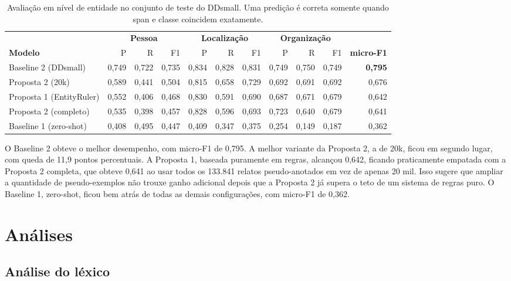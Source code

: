 \documentclass[12pt,a4paper]{article}
\begin{document}
\begin{table}[H]
\centering
\caption{Avaliação em nível de entidade no conjunto de teste do DDsmall.
Uma predição é correta somente quando span e classe coincidem exatamente.}
\label{tab:entidade}
\small
\begin{tabular}{lrrrrrrrrrr}
\toprule
& \multicolumn{3}{c}{\textbf{Pessoa}} & \multicolumn{3}{c}{\textbf{Localização}} & \multicolumn{3}{c}{\textbf{Organização}} & \\
\cmidrule(lr){2-4}\cmidrule(lr){5-7}\cmidrule(lr){8-10}
\textbf{Modelo} & P & R & F1 & P & R & F1 & P & R & F1 & \textbf{micro-F1} \\
\midrule
Baseline 2 (DDsmall)    & 0,749 & 0,722 & 0,735 & 0,834 & 0,828 & 0,831 & 0,749 & 0,750 & 0,749 & \textbf{0,795} \\
Proposta 2 (20k)        & 0,589 & 0,441 & 0,504 & 0,815 & 0,658 & 0,729 & 0,692 & 0,691 & 0,692 & 0,676 \\
Proposta 1 (EntityRuler)& 0,552 & 0,406 & 0,468 & 0,830 & 0,591 & 0,690 & 0,687 & 0,671 & 0,679 & 0,642 \\
Proposta 2 (completo)   & 0,535 & 0,398 & 0,457 & 0,828 & 0,596 & 0,693 & 0,723 & 0,640 & 0,679 & 0,641 \\
Baseline 1 (zero-shot)  & 0,408 & 0,495 & 0,447 & 0,409 & 0,347 & 0,375 & 0,254 & 0,149 & 0,187 & 0,362 \\
\bottomrule
\end{tabular}
\end{table}

O Baseline 2 obteve o melhor desempenho, com micro-F1 de 0,795. A melhor
variante da Proposta 2, a de 20k, ficou em segundo lugar, com queda de 11,9
pontos percentuais. A Proposta 1, baseada puramente em regras, alcançou 0,642,
ficando praticamente empatada com a Proposta 2 completa, que obteve 0,641 ao
usar todos os 133.841 relatos pseudo-anotados em vez de apenas 20 mil. Isso
sugere que ampliar a quantidade de pseudo-exemplos não trouxe ganho adicional
depois que a Proposta 2 já supera o teto de um sistema de regras puro. O
Baseline 1, zero-shot, ficou bem atrás de todas as demais configurações, com
micro-F1 de 0,362.

\section{Análises}

\subsection{Análise do léxico}
\end{document}
